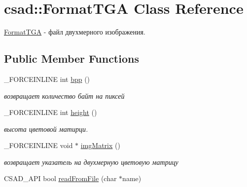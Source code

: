 \hypertarget{classcsad_1_1_format_t_g_a}{\section{csad\-:\-:Format\-T\-G\-A Class Reference}
\label{classcsad_1_1_format_t_g_a}
}


\hyperlink{classcsad_1_1_format_t_g_a}{Format\-T\-G\-A} -\/ файл двухмерного изображения.  


\subsection*{Public Member Functions}
\begin{DoxyCompactItemize}
\item 
\hypertarget{classcsad_1_1_format_t_g_a_a92c9f8db7378a2dd4968bfdc7713729c}{\-\_\-\-F\-O\-R\-C\-E\-I\-N\-L\-I\-N\-E int \hyperlink{classcsad_1_1_format_t_g_a_a92c9f8db7378a2dd4968bfdc7713729c}{bpp} ()}\label{classcsad_1_1_format_t_g_a_a92c9f8db7378a2dd4968bfdc7713729c}

\begin{DoxyCompactList}\small\item\em возвращает количество байт на пиксей \end{DoxyCompactList}\item 
\hypertarget{classcsad_1_1_format_t_g_a_a8306c75bcd5965aa66240b7af2e40d11}{\-\_\-\-F\-O\-R\-C\-E\-I\-N\-L\-I\-N\-E int \hyperlink{classcsad_1_1_format_t_g_a_a8306c75bcd5965aa66240b7af2e40d11}{height} ()}\label{classcsad_1_1_format_t_g_a_a8306c75bcd5965aa66240b7af2e40d11}

\begin{DoxyCompactList}\small\item\em высота цветовой матирци. \end{DoxyCompactList}\item 
\hypertarget{classcsad_1_1_format_t_g_a_acebaababf481d1b48b6f63af59c95632}{\-\_\-\-F\-O\-R\-C\-E\-I\-N\-L\-I\-N\-E void $\ast$ \hyperlink{classcsad_1_1_format_t_g_a_acebaababf481d1b48b6f63af59c95632}{img\-Matrix} ()}\label{classcsad_1_1_format_t_g_a_acebaababf481d1b48b6f63af59c95632}

\begin{DoxyCompactList}\small\item\em возвращает указатель на двухмерную цветовую матрицу \end{DoxyCompactList}\item 
\hypertarget{classcsad_1_1_format_t_g_a_ab2eda94d067cb4dd7dbfef17f9eba359}{C\-S\-A\-D\-\_\-\-A\-P\-I bool \hyperlink{classcsad_1_1_format_t_g_a_ab2eda94d067cb4dd7dbfef17f9eba359}{read\-From\-File} (char $\ast$name)}\label{classcsad_1_1_format_t_g_a_ab2eda94d067cb4dd7dbfef17f9eba359}


\end{DoxyCompactItemize}
